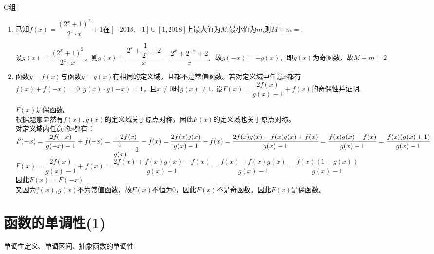 C组：
\begin{enumerate}
    \item 已知$f(x) = \dfrac{(2^x+1)^2}{2^x \cdot x}+1$在$[-2018, -1]\cup[1, 2018]$上最大值为$M$,最小值为$m$,则$M+m = $.
    \begin{jieda}
    设$g(x) = \dfrac{(2^x+1)^2}{2^x \cdot x}$，则$g(x) = \dfrac{2^x+\dfrac{1}{2^x}+2}{x} = \dfrac{2^x+2^{-x}+2}{x}$，故$g(-x) = -g(x)$，即$g(x)$为奇函数，故$M+m = 2$
    \end{jieda}
    \item 函数$y = f(x)$与函数$y = g(x)$有相同的定义域，且都不是常值函数。若对定义域中任意$x$都有$f(x)+f(-x) = 0, g(x)\cdot g(-x) = 1$，且$x \neq 0$时$g(x) \neq 1$. 设$F(x) = \dfrac{2f(x)}{g(x) - 1} + f(x)$的奇偶性并证明.
    \begin{jieda}
        $F(x)$是偶函数。 \\
        根据题意显然有$f(x), g(x)$的定义域关于原点对称，因此$F(x)$的定义域也关于原点对称。\\
        对定义域内任意的$x$都有：\\
        $F(-x) = \dfrac{2f(-x)}{g(-x) - 1} + f(-x) = \dfrac{-2f(x)}{\dfrac{1}{g(x)} - 1} - f(x) = \dfrac{2f(x)g(x)}{g(x)-1} - f(x) \\
        = \dfrac{2f(x)g(x)- f(x)g(x) + f(x)}{g(x)-1} = \dfrac{f(x)g(x) + f(x)}{g(x)-1} = \dfrac{f(x)(g(x) + 1)}{g(x)-1}$ \\
        $F(x) = \dfrac{2f(x)}{g(x) - 1} + f(x) = \dfrac{2f(x) + f(x)g(x) - f(x)}{g(x) - 1} = \dfrac{f(x) + f(x)g(x)}{g(x) - 1} = \dfrac{f(x)(1+g(x))}{g(x) - 1}$ \\
        因此$F(x) = F(-x)$ \\
        又因为$f(x), g(x)$不为常值函数，故$F(x)$不恒为0，因此$F(x)$不是奇函数。因此$F(x)$是偶函数。
    \end{jieda}

\end{enumerate}


\section{函数的单调性(1)}

\zsd 单调性定义、单调区间、抽象函数的单调性


